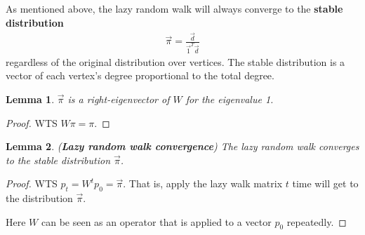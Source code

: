 \documentclass[]{article}
\newtheorem{lemma}{Lemma}[section]
\begin{document}
As mentioned above, the lazy random walk will always converge to the \textbf{stable distribution}
\begin{align*}
	\vec{\pi} = \frac{\vec{d}}{\vec{1}^T \vec{d}}
\end{align*}
regardless of the original distribution over vertices. The stable distribution is a vector of each vertex's degree proportional to the total degree. 

\begin{lemma}
	$\vec{\pi}$ is a right-eigenvector of $W$ for the eigenvalue 1. 
\end{lemma}
\begin{proof}
	WTS $W\pi = \pi$.
\end{proof}

\begin{lemma} (\textbf{Lazy random walk convergence})
	The lazy random walk converges to the stable distribution $\vec{\pi}$.
\end{lemma}
\begin{proof}
	WTS $p_t = W^t p_0 = \vec{\pi}$. That is, apply the lazy walk matrix $t$ time will get to the distribution $\vec{\pi}$.
	
	Here $W$ can be seen as an operator that is applied to a vector $p_0$ repeatedly. 
\end{proof}
\end{document}
